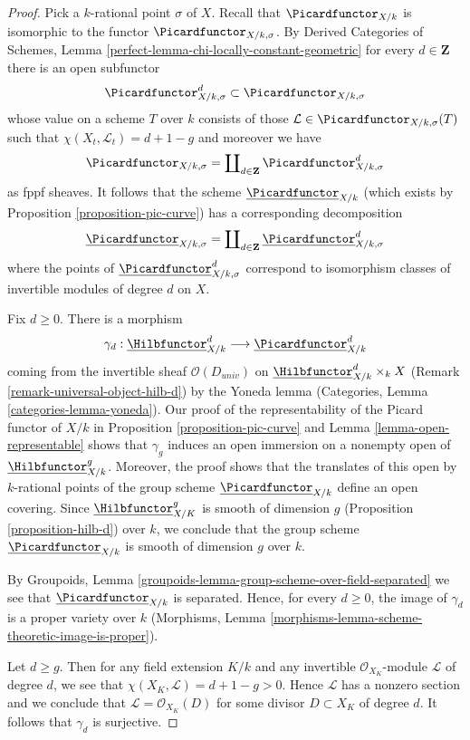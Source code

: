 \begin{proof}
Pick a $k$-rational point $\sigma$ of $X$. Recall that $\Picardfunctor_{X/k}$
is isomorphic to the functor $\Picardfunctor_{X/k, \sigma}$. By
Derived Categories of Schemes, Lemma
\ref{perfect-lemma-chi-locally-constant-geometric}
for every $d \in \mathbf{Z}$ there is an open subfunctor
$$
\Picardfunctor^d_{X/k, \sigma} \subset \Picardfunctor_{X/k, \sigma}
$$
whose value on a scheme $T$ over $k$ consists of those
$\mathcal{L} \in \Picardfunctor_{X/k, \sigma}(T)$ such that
$\chi(X_t, \mathcal{L}_t) = d + 1 - g$ and moreover we have
$$
\Picardfunctor_{X/k, \sigma} =
\coprod\nolimits_{d \in \mathbf{Z}} \Picardfunctor^d_{X/k, \sigma}
$$
as fppf sheaves. It follows that the scheme $\underline{\Picardfunctor}_{X/k}$
(which exists by Proposition \ref{proposition-pic-curve})
has a corresponding decomposition
$$
\underline{\Picardfunctor}_{X/k, \sigma} =
\coprod\nolimits_{d \in \mathbf{Z}} \underline{\Picardfunctor}^d_{X/k, \sigma}
$$
where the points of $\underline{\Picardfunctor}^d_{X/k, \sigma}$ correspond
to isomorphism classes of invertible modules of degree $d$ on $X$.

\medskip\noindent
Fix $d \geq 0$. There is a morphism
$$
\gamma_d :
\underline{\Hilbfunctor}^d_{X/k}
\longrightarrow
\underline{\Picardfunctor}^d_{X/k}
$$
coming from the invertible sheaf $\mathcal{O}(D_{univ})$ on
$\underline{\Hilbfunctor}^d_{X/k} \times_k X$
(Remark \ref{remark-universal-object-hilb-d}) by the Yoneda lemma
(Categories, Lemma \ref{categories-lemma-yoneda}).
Our proof of the representability of the Picard functor of $X/k$
in Proposition \ref{proposition-pic-curve} and
Lemma \ref{lemma-open-representable} shows that $\gamma_g$
induces an open immersion on a nonempty open of
$\underline{\Hilbfunctor}^g_{X/k}$. Moreover, the proof shows
that the translates of this open by $k$-rational points of
the group scheme $\underline{\Picardfunctor}_{X/k}$ define
an open covering. Since
$\underline{\Hilbfunctor}^g_{X/K}$ is smooth of dimension $g$
(Proposition \ref{proposition-hilb-d})
over $k$, we conclude that the
group scheme $\underline{\Picardfunctor}_{X/k}$ is smooth of dimension $g$
over $k$.

\medskip\noindent
By Groupoids, Lemma \ref{groupoids-lemma-group-scheme-over-field-separated}
we see that $\underline{\Picardfunctor}_{X/k}$ is separated.
Hence, for every $d \geq 0$, the image of $\gamma_d$
is a proper variety over $k$
(Morphisms, Lemma \ref{morphisms-lemma-scheme-theoretic-image-is-proper}).

\medskip\noindent
Let $d \geq g$. Then for any field extension $K/k$ and any invertible
$\mathcal{O}_{X_K}$-module $\mathcal{L}$ of degree $d$, we see that
$\chi(X_K, \mathcal{L}) = d + 1 - g > 0$. Hence $\mathcal{L}$ has a
nonzero section and we conclude that $\mathcal{L} = \mathcal{O}_{X_K}(D)$
for some divisor $D \subset X_K$ of degree $d$. It follows that
$\gamma_d$ is surjective.


\end{proof}
